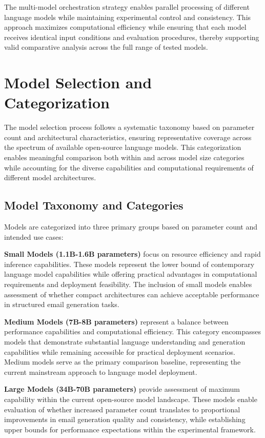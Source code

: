 The multi-model orchestration strategy enables parallel processing of different language models while maintaining experimental control and consistency. This approach maximizes computational efficiency while ensuring that each model receives identical input conditions and evaluation procedures, thereby supporting valid comparative analysis across the full range of tested models.

\section{Model Selection and Categorization}
\label{sec:model-selection}

The model selection process follows a systematic taxonomy based on parameter count and architectural characteristics, ensuring representative coverage across the spectrum of available open-source language models. This categorization enables meaningful comparison both within and across model size categories while accounting for the diverse capabilities and computational requirements of different model architectures.

\subsection{Model Taxonomy and Categories}

Models are categorized into three primary groups based on parameter count and intended use cases:

\textbf{Small Models (1.1B-1.6B parameters)} focus on resource efficiency and rapid inference capabilities. These models represent the lower bound of contemporary language model capabilities while offering practical advantages in computational requirements and deployment feasibility. The inclusion of small models enables assessment of whether compact architectures can achieve acceptable performance in structured email generation tasks.

\textbf{Medium Models (7B-8B parameters)} represent a balance between performance capabilities and computational efficiency. This category encompasses models that demonstrate substantial language understanding and generation capabilities while remaining accessible for practical deployment scenarios. Medium models serve as the primary comparison baseline, representing the current mainstream approach to language model deployment.

\textbf{Large Models (34B-70B parameters)} provide assessment of maximum capability within the current open-source model landscape. These models enable evaluation of whether increased parameter count translates to proportional improvements in email generation quality and consistency, while establishing upper bounds for performance expectations within the experimental framework.

